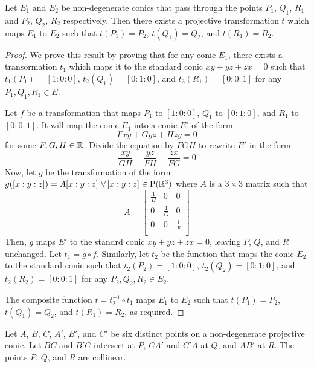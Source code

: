 \begin{prop}
  Let $E_1$ and $E_2$ be non-degenerate conics that pass through the points $P_1$, $Q_1$, $R_1$
  and $P_2$, $Q_2$, $R_2$ respectively. Then there exists a projective transformation $t$ which
  maps $E_1$ to $E_2$ such that $t(P_1)=P_2$, $t(Q_1)=Q_2$, and $t(R_1)=R_2$.
\end{prop}

\begin{proof}
  We prove this result by proving that for any conic $E_1$, there exists a transormation $t_1$
  which maps it to the standard conic $xy+yz+zx=0$ such that $t_1(P_1)=[1:0:0]$,
  $t_2(Q_1)=[0:1:0]$, and $t_3(R_1)=[0:0:1]$ for any $P_1,Q_1,R_1\in E$.

  Let $f$ be a transformation that maps $P_1$ to $[1:0:0]$, $Q_1$ to $[0:1:0]$, and $R_1$ to
  $[0:0:1]$. It will map the conic $E_1$ into a conic $E'$ of the form
  \[
    Fxy+Gyz+Hzy=0
  \]
  for some $F,G,H\in\mathbb{R}$. Divide the equation by $FGH$ to rewrite $E'$ in the form
  \[
    \frac{xy}{GH}+\frac{yz}{FH}+\frac{zx}{FG}=0
  \]
  Now, let $g$ be the transformation of the form $g([x:y:z])=A[x:y:z]\ {\forall\,[x:y:z]\in\Prj(\R^3)}$
  where $A$ is a $3\times 3$ matrix such that
  \[
    A=
    \begin{bmatrix}
      \frac{1}{H} & 0           & 0           \\
      0           & \frac{1}{G} & 0           \\
      0           & 0           & \frac{1}{F} \\
    \end{bmatrix}
  \]
  Then, $g$ maps $E'$ to the standrd conic $xy+yz+zx=0$, leaving $P$, $Q$, and $R$ unchanged.
  Let $t_1=g\circ f$. Similarly, let $t_2$ be the function that maps the conic $E_2$ to the
  standard conic such that $t_2(P_2)=[1:0:0]$, $t_2(Q_2)=[0:1:0]$, and $t_2(R_2)=[0:0:1]$
  for any $P_2,Q_2,R_2\in E_2$.

  The composite function $t=t_2^{-1}\circ t_1$ maps $E_1$ to $E_2$ such that $t(P_1)=P_2$,
  $t(Q_1)=Q_2$, and $t(R_1)=R_2$, as required.
\end{proof}

\begin{theorem}
  Let $A$, $B$, $C$, $A'$, $B'$, and $C'$ be six distinct points on a non-degenerate projective
  conic. Let $BC$ and $B'C$ intersect at $P$, $CA'$ and $C'A$ at $Q$, and $AB'$ at $R$. The
  points $P$, $Q$, and $R$ are collinear.
\end{theorem}

